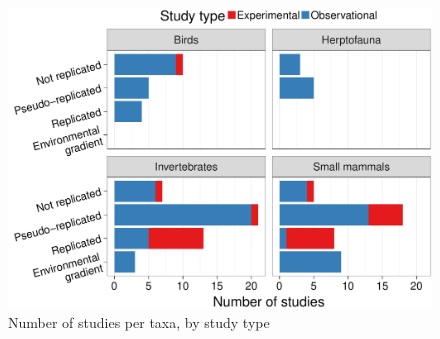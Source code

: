 \documentclass[final]{beamer}\usepackage[]{graphicx}\usepackage[]{color}
\makeatletter
\def\maxwidth{ %
  \ifdim\Gin@nat@width>\linewidth
    \linewidth
  \else
    \Gin@nat@width
  \fi
}
\newenvironment{knitrout}{}{} %
\newlength{\twocolwid}
\makeatother
\begin{document}
\begin{frame}[t]
\begin{columns}[t]
\begin{column}{\twocolwid}
\begin{columns}[T]
\begin{column}{0.45\textwidth}
\begin{knitrout}
\color{fgcolor}\begin{figure}

\includegraphics[width=\maxwidth]{figure/beamer-study_types-1} \hfill{}

\caption[ Number of studies per taxa, by study type]{ Number of studies per taxa, by study type}\label{fig:study_types}
\end{figure}


\end{knitrout}


\end{column}%
\end{columns}

\begin{columns}[t,totalwidth=\twocolwid] %





\end{columns}
\end{column}
\end{columns}
\end{frame}
\end{document}
